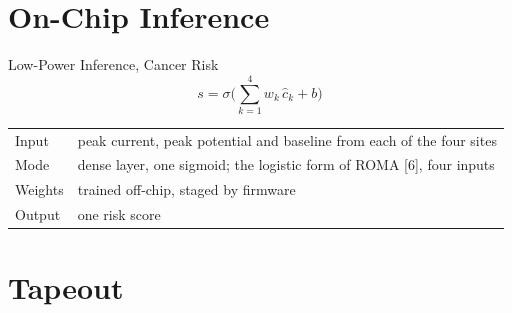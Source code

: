 \documentclass[10pt, aspectratio=169]{beamer}
\begin{document}
\section{On-Chip Inference}


\begin{frame}{Low-Power Inference, Cancer Risk}
\centering
\vspace{0.3cm}
\[ s = \sigma\Big(\sum_{k=1}^{4} w_k\,\hat{c}_k + b\Big) \]
\vspace{0.4cm}

{\footnotesize
\begin{tabular}{@{}ll@{}}
\toprule
Input   & peak current, peak potential and baseline from each of the four sites \\
Mode    & dense layer, one sigmoid; the logistic form of ROMA [6], four inputs \\
Weights & trained off-chip, staged by firmware \\
Output  & one risk score \\
\bottomrule
\end{tabular}}
\end{frame}

\section{Tapeout}
\end{document}
